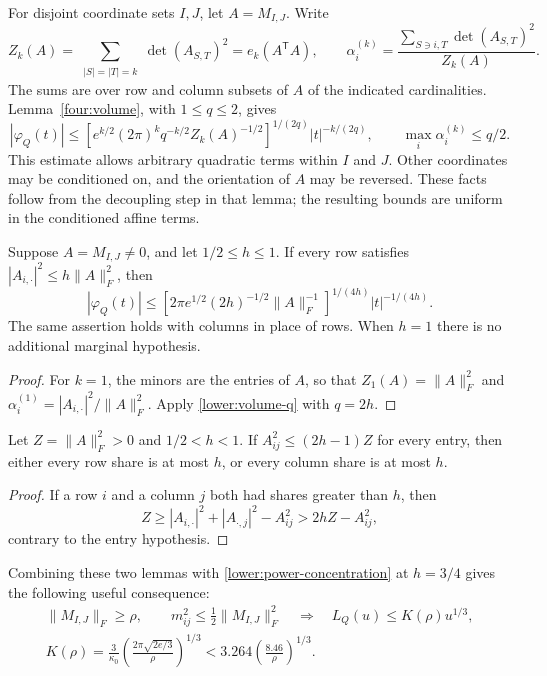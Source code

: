 For disjoint coordinate sets $I,J$, let $A=M_{I,J}$.  Write
\[
 Z_k(A)=\sum_{\substack{|S|=|T|=k}}
                   \det(A_{S,T})^2=e_k(A^{\mathsf T}A),
 \qquad
 \alpha_i^{(k)}=
 \frac{\sum_{S\ni i,T}\det(A_{S,T})^2}{Z_k(A)}.
\]
The sums are over row and column subsets of $A$ of the indicated
cardinalities.  Lemma~\ref{four:volume}, with $1\leq q\leq2$,
gives
\begin{equation}\label{lower:volume-q}
 |\varphi_Q(t)|\leq
 \left[e^{k/2}(2\pi)^kq^{-k/2}Z_k(A)^{-1/2}\right]^{1/(2q)}
 |t|^{-k/(2q)},
 \qquad \max_i\alpha_i^{(k)}\leq q/2.
\end{equation}
This estimate allows arbitrary quadratic terms within $I$ and $J$.
Other coordinates may be conditioned on, and the orientation of $A$
may be reversed.  These facts follow from the decoupling step in
that lemma; the resulting bounds are uniform in the conditioned
affine terms.

\begin{lemma}\label{lower:first-volume}
Suppose $A=M_{I,J}\ne0$, and let $1/2\leq h\leq1$.
If every row satisfies $|A_{i,\cdot}|^2\leq h\|A\|_F^2$, then
\begin{equation}\label{lower:first-volume-bound}
 |\varphi_Q(t)|\leq
 \left[2\pi e^{1/2}(2h)^{-1/2}\|A\|_F^{-1}\right]^{1/(4h)}
 |t|^{-1/(4h)}.
\end{equation}
The same assertion holds with columns in place of rows.  When $h=1$
there is no additional marginal hypothesis.
\end{lemma}
\begin{proof}
For $k=1$, the minors are the entries of $A$, so that
$Z_1(A)=\|A\|_F^2$ and
$\alpha_i^{(1)}=|A_{i,\cdot}|^2/\|A\|_F^2$.
Apply \eqref{lower:volume-q} with $q=2h$.
\end{proof}

\begin{lemma}\label{lower:orientation}
Let $Z=\|A\|_F^2>0$ and $1/2<h<1$.  If
$A_{ij}^2\leq(2h-1)Z$ for every entry, then either every row share
is at most $h$, or every column share is at most $h$.
\end{lemma}
\begin{proof}
If a row $i$ and a column $j$ both had shares greater than $h$, then
\[
 Z\geq |A_{i,\cdot}|^2+|A_{\cdot,j}|^2-A_{ij}^2
   >2hZ-A_{ij}^2,
\]
contrary to the entry hypothesis.
\end{proof}

Combining these two lemmas with \eqref{lower:power-concentration}
at $h=3/4$ gives the following useful consequence:
\begin{equation}\label{lower:third-power}
 \begin{split}
 \|M_{I,J}\|_F\geq\rho,\qquad
 m_{ij}^2\leq\tfrac12\|M_{I,J}\|_F^2
 \quad\Longrightarrow\quad
 L_Q(u)\leq K(\rho)u^{1/3},\\
 K(\rho)=\frac3{\kappa_0}
       \left(\frac{2\pi\sqrt{2e/3}}{\rho}\right)^{1/3}
 <3.264\left(\frac{8.46}{\rho}\right)^{1/3}.
 \end{split}
\end{equation}

